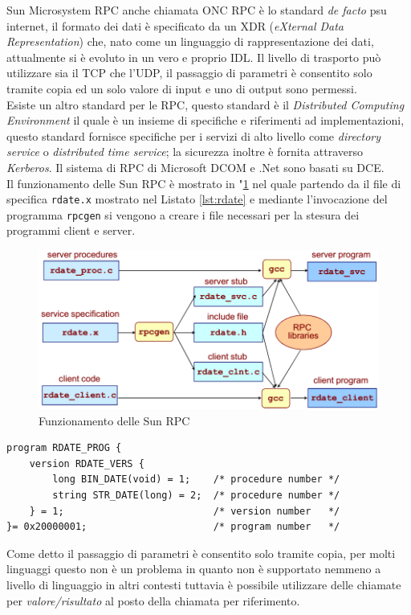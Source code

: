Sun Microsystem RPC anche chiamata ONC RPC è lo standard \emph{de facto} psu internet, il formato dei dati è specificato da un XDR (\emph{eXternal Data Representation}) che, nato come un linguaggio di rappresentazione dei dati, attualmente si è evoluto in un vero e proprio IDL. Il livello di trasporto può utilizzare sia il TCP che l'UDP, il passaggio di parametri è consentito solo tramite copia ed un solo valore di input e uno di output sono permessi.\\
Esiste un altro standard per le RPC, questo standard è il \emph{Distributed Computing Environment} il quale è un insieme di specifiche e riferimenti ad implementazioni, questo standard fornisce specifiche per i servizi di alto livello come \emph{directory service} o \emph{distributed time service}; la sicurezza inoltre è fornita attraverso \emph{Kerberos}. Il sistema di RPC di Microsoft DCOM e .Net sono basati su DCE.\\
Il funzionamento delle Sun RPC è mostrato in \figurename"\ref{fig:sunrpc} nel quale partendo da il file di specifica \texttt{rdate.x} mostrato nel Listato \ref{lst:rdate} e mediante l'invocazione del programma \texttt{rpcgen} si vengono a creare i file necessari per la stesura dei programmi client e server.
\begin{figure}
\centering
\includegraphics[width=0.7\linewidth]{img/sunrpc}
\caption{Funzionamento delle Sun RPC}
\label{fig:sunrpc}
\end{figure}
\begin{lstlisting}[language=IDL,caption="Esempio di file rdate.x",label=lst:rdate]
program RDATE_PROG {
    version RDATE_VERS {
        long BIN_DATE(void) = 1;	/* procedure number */
        string STR_DATE(long) = 2;	/* procedure number */
    } = 1;							/* version number   */
}= 0x20000001;						/* program number   */
\end{lstlisting}
Come detto il passaggio di parametri è consentito solo tramite copia, per molti linguaggi questo non è un problema in quanto non è supportato nemmeno a livello di linguaggio in altri contesti tuttavia è possibile utilizzare delle chiamate per \emph{valore/risultato} al posto della chiamata per riferimento.
